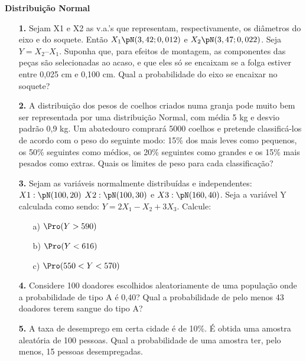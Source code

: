\begin{center}
\textbf{\LARGE{Distribuição Normal}}
\end{center}

\begin{itemize}
	\item[\textbf{1.}] Sejam X1 e X2 as v.a.’s que representam, respectivamente, os diâmetros do eixo e do soquete. Então $X_1 \pN( 3,42 ; 0,012 )$ e $X_2 \pN( 3,47 ; 0,022 ) $. Seja $Y =X_2 – X_1$. Suponha que, para efeitos de montagem, as componentes das peças são selecionadas ao acaso, e que eles só se encaixam se a folga estiver entre 0,025 cm e 0,100 cm. Qual a probabilidade do eixo se encaixar no soquete?\\
	\resposta{}
	
	
	\item[\textbf{2.}] A distribuição dos pesos de coelhos criados numa granja pode muito bem ser representada por uma distribuição Normal, com média 5 kg e desvio padrão 0,9 kg. Um abatedouro comprará 5000 coelhos e pretende classificá-los de acordo com o peso do seguinte modo: 15\% dos mais leves como pequenos, os 50\% seguintes como médios, os 20\% seguintes como grandes e os 15\% mais pesados como extras. Quais os limites de peso para cada classificação?
	\resposta{}
	 
	\item[\textbf{3.}] Sejam as variáveis normalmente distribuídas e independentes: $X1: \pN(100, 20)$ $X2: \pN(100, 30)$ e $X3: \pN(160, 40)$. Seja a variável Y calculada como sendo: $Y= 2X_1-X_2+3X_3$. Calcule:
		\begin{itemize}
		\item[a)]$\Pro(Y>590)$
	        \resposta{}
		\item[b)] $\Pro(Y<616)$
		    \resposta{}
		\item[c)] $\Pro(550<Y<570)$
		    \resposta{}
	\end{itemize}
	
	\item[\textbf{4.}] Considere 100 doadores escolhidos aleatoriamente de uma população onde a probabilidade de tipo A é 0,40? Qual a probabilidade de pelo menos 43 doadores terem sangue do tipo A?
	
	\item[\textbf{5.}] A taxa de desemprego em certa cidade é de 10\%. É obtida uma amostra aleatória de 100 pessoas. Qual a probabilidade de uma amostra ter, pelo menos, 15 pessoas desempregadas.
	

\end{itemize}
